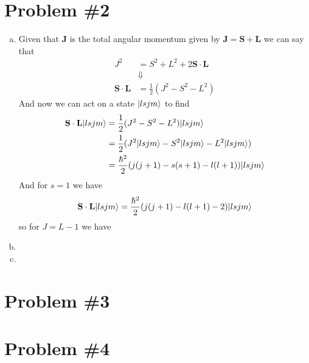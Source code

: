 \documentclass[11pt]{article}
\numberwithin{equation}{section}
\begin{document}
\section{Problem \#2}
\begin{enumerate}[(a)]
\item
Given that $\mathbf{J}$ is the total angular momentum given by $\mathbf{J} = \mathbf{S}+\mathbf{L}$ we can say that
\begin{align*}
J^2 &= S^2 + L^2 + 2\mathbf{S}\cdot\mathbf{L}\\
&\Downarrow\\
\mathbf{S}\cdot\mathbf{L} &= \frac{1}{2}(J^2 - S^2 - L^2)
\end{align*}
And now we can act on a state $|{lsjm}\rangle$ to find
\begin{align*}
\mathbf{S}\cdot\mathbf{L}|{lsjm}\rangle &=\frac{1}{2}(J^2 - S^2 - L^2)|{lsjm}\rangle\\ 
&=\frac{1}{2}(J^2|{lsjm}\rangle - S^2|{lsjm}\rangle - L^2|{lsjm}\rangle)\\ 
&=\frac{\hbar^2}{2}(j(j+1)-s(s+1)-l(l+1))|{lsjm}\rangle  
\end{align*}
And for $s = 1$ we have
$$\mathbf{S}\cdot\mathbf{L}|{lsjm}\rangle =\frac{\hbar^2}{2}(j(j+1)-l(l+1)-2)|{lsjm}\rangle$$
so for $J = L - 1$ we have

\item
\item
\end{enumerate}

\section{Problem \#3}

\section{Problem \#4}
\end{document}

